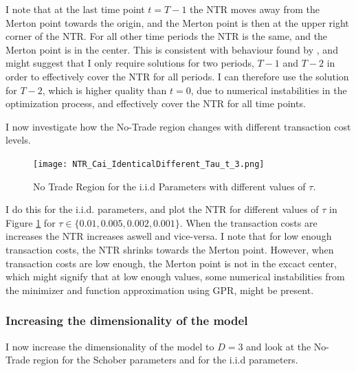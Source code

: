\documentclass[11pt]{article}
\begin{document}
I note that at the last time point $t = T-1$ the \ac{NTR} moves away from the Merton point towards the origin, and the Merton point is
then at the upper right corner of the \ac{NTR}. For all other time periods the \ac{NTR} is the same, and the Merton point is in the center.
This is consistent with behaviour found by \autocites{CaiJuddXu2013}{Scheidegger2023},
and might suggest that I only require solutions for two periods, $T-1$ and $T-2$ in order to
effectively cover the \ac{NTR} for all periods. I can therefore use the solution for $T-2$, which is higher quality than $t=0$, due to numerical instabilities in the optimization process,
and effectively cover the \ac{NTR} for all time points. 

I now investigate how the No-Trade region changes with different transaction cost levels.
\begin{figure}[!ht]
    \centering
    \texttt{[image: NTR\_Cai\_IdenticalDifferent\_Tau\_t\_3.png]}
    \caption{No Trade Region for the i.i.d Parameters with different values of $\tau$.}
    \label{fig:NTR_2d_iid_tau_analysis}
\end{figure}
I do this for the i.i.d. parameters, and plot the \ac{NTR} for different values of $\tau$ in Figure \ref{fig:NTR_2d_iid_tau_analysis} for $\tau \in \{ 0.01, 0.005, 0.002, 0.001 \}$.
When the transaction costs are increases the \ac{NTR} increases aswell and vice-versa. 
I note that for low enough transaction costs, the \ac{NTR} shrinks towards the Merton point.
However, when transaction costs are low enough, the Merton point is not in the excact center, which might signify that at low enough values, some numerical instabilities from the
minimizer and function approximation using \ac{GPR}, might be present.

\subsubsection{Increasing the dimensionality of the model} \label{Subsubsection: IncreasingDimensionality}
I now increase the dimensionality of the model to $D = 3$ and look at the No-Trade region for the Schober parameters and for the i.i.d parameters.
\end{document}
